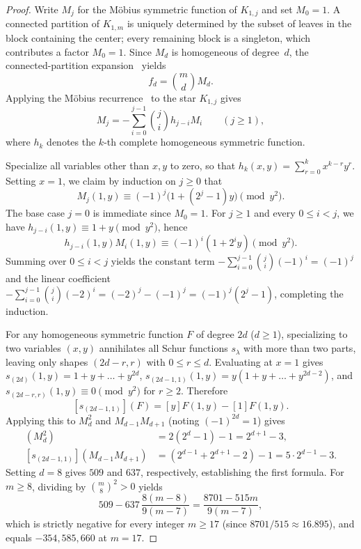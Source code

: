 \documentclass[11pt,letterpaper]{article}
\newcommand{\coef}[2]{[#1]\!\left(#2\right)}
\begin{document}
\begin{proof}
Write $M_j$ for the M\"obius symmetric function of $K_{1,j}$ and set $M_0=1$. A connected partition of $K_{1,m}$ is uniquely determined by the subset of leaves in the block containing the center; every remaining block is a singleton, which contributes a factor $M_0 = 1$. Since $M_d$ is homogeneous of degree~$d$, the connected-partition expansion~\cite[Eq.~(7.1)]{bond} yields
\[
f_d = \binom{m}{d} M_d.
\]
Applying the M\"obius recurrence~\cite[Eq.~(5.3)]{bond} to the star $K_{1,j}$ gives
\[
M_j = -\sum_{i=0}^{j-1} \binom{j}{i} h_{j-i} M_i \qquad (j \geq 1),
\]
where $h_k$ denotes the $k$-th complete homogeneous symmetric function.

Specialize all variables other than $x,y$ to zero, so that $h_k(x,y) = \sum_{r=0}^{k} x^{k-r}y^r$. Setting $x=1$, we claim by induction on $j \geq 0$ that
\[
M_j(1,y) \equiv (-1)^j \bigl(1 + (2^j - 1)y\bigr) \pmod{y^2}.
\]
The base case $j=0$ is immediate since $M_0 = 1$. For $j \geq 1$ and every $0 \leq i < j$, we have $h_{j-i}(1,y) \equiv 1+y \pmod{y^2}$, hence
\[
h_{j-i}(1,y) M_i(1,y) \equiv (-1)^i(1 + 2^i y) \pmod{y^2}.
\]
Summing over $0 \leq i < j$ yields the constant term $-\sum_{i=0}^{j-1}\binom{j}{i}(-1)^i = (-1)^j$ and the linear coefficient $-\sum_{i=0}^{j-1}\binom{j}{i}(-2)^i = (-2)^j - (-1)^j = (-1)^j(2^j - 1)$, completing the induction.

For any homogeneous symmetric function $F$ of degree $2d$ ($d \geq 1$), specializing to two variables $(x,y)$ annihilates all Schur functions $s_\lambda$ with more than two parts, leaving only shapes $(2d-r, r)$ with $0 \leq r \leq d$. Evaluating at $x=1$ gives $s_{(2d)}(1,y) = 1 + y + \dots + y^{2d}$, $s_{(2d-1,1)}(1,y) = y(1 + y + \dots + y^{2d-2})$, and $s_{(2d-r,r)}(1,y) \equiv 0 \pmod{y^2}$ for $r \geq 2$. Therefore
\[
\coef{s_{(2d-1,1)}}{F} = [y]F(1,y) - [1]F(1,y).
\]
Applying this to $M_d^2$ and $M_{d-1}M_{d+1}$ (noting $(-1)^{2d}=1$) gives
\begin{align*}
\coef{s_{(2d-1,1)}}{M_d^2} &= 2(2^d - 1) - 1 = 2^{d+1} - 3,\\
\coef{s_{(2d-1,1)}}{M_{d-1}M_{d+1}} &= (2^{d-1} + 2^{d+1} - 2) - 1 = 5 \cdot 2^{d-1} - 3.
\end{align*}
Setting $d=8$ gives $509$ and $637$, respectively, establishing the first formula. For $m \geq 8$, dividing by $\binom{m}{8}^2 > 0$ yields
\[
509 - 637\,\frac{8(m-8)}{9(m-7)} = \frac{8701 - 515m}{9(m-7)},
\]
which is strictly negative for every integer $m \geq 17$ (since $8701/515 \approx 16.895$), and equals $-354{,}585{,}660$ at $m=17$.


\end{proof}
\end{document}

